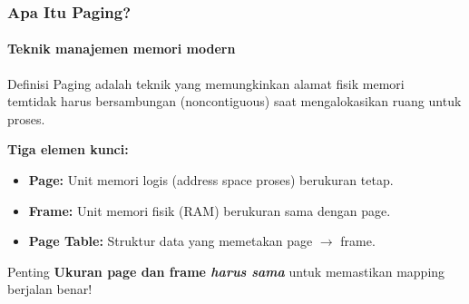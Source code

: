 \documentclass[t,aspectratio=169,xcolor=dvipsnames]{beamer}
\newcommand{\tem}[1]{\textbf{\textcolor{red}{#1}}}
\begin{document}
\begin{frame}
    \frametitle{Apa Itu Paging?}
    \framesubtitle{Teknik manajemen memori modern}
    \small
    \begin{block}{Definisi}
        Paging adalah teknik yang memungkinkan alamat fisik memori \\tem{tidak harus bersambungan} (noncontiguous) saat mengalokasikan ruang untuk proses.
    \end{block}

    \vspace{0.2cm}
    \textbf{Tiga elemen kunci:}
    \begin{itemize}
        \item \textbf{Page:} Unit memori logis (address space proses) berukuran tetap.
        \item \textbf{Frame:} Unit memori fisik (RAM) berukuran sama dengan page.
        \item \textbf{Page Table:} Struktur data yang memetakan page $\rightarrow$ frame.
    \end{itemize}

    \vspace{0.2cm}
    \begin{alertblock}{Penting}
        \textbf{Ukuran page dan frame {\em harus sama}} untuk memastikan mapping berjalan benar!
    \end{alertblock}
\end{frame}
\end{document}
